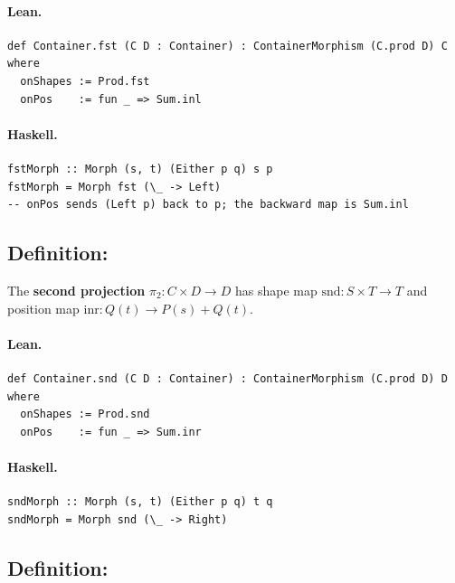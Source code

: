 \documentclass[11pt,a4paper]{article}
\begin{document}
\paragraph{Lean.}
\begin{lstlisting}[style=lean]
def Container.fst (C D : Container) : ContainerMorphism (C.prod D) C where
  onShapes := Prod.fst
  onPos    := fun _ => Sum.inl
\end{lstlisting}

\paragraph{Haskell.}
\begin{lstlisting}[style=haskell]
fstMorph :: Morph (s, t) (Either p q) s p
fstMorph = Morph fst (\_ -> Left)
-- onPos sends (Left p) back to p; the backward map is Sum.inl
\end{lstlisting}


\subsection{Definition: }

\begin{defn}
The \textbf{second projection} $\pi_2 : C \times D \to D$ has shape map
$\mathrm{snd} : S \times T \to T$ and position map $\mathrm{inr} : Q(t) \to
P(s) + Q(t)$.
\end{defn}

\paragraph{Lean.}
\begin{lstlisting}[style=lean]
def Container.snd (C D : Container) : ContainerMorphism (C.prod D) D where
  onShapes := Prod.snd
  onPos    := fun _ => Sum.inr
\end{lstlisting}

\paragraph{Haskell.}
\begin{lstlisting}[style=haskell]
sndMorph :: Morph (s, t) (Either p q) t q
sndMorph = Morph snd (\_ -> Right)
\end{lstlisting}


\subsection{Definition: }
\end{document}
